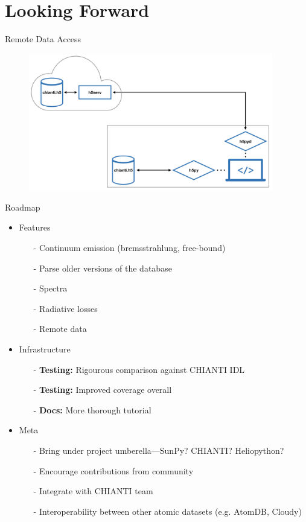 \documentclass[12pt,aspectratio=169]{beamer}
\begin{document}
\section{Looking Forward}
\begin{frame}{Remote Data Access}
    \begin{figure}
        \centering
        \includegraphics[width=0.95\textwidth]{../figures/cloud_diagram.png}
    \end{figure}
\end{frame}
\begin{frame}[allowframebreaks]{Roadmap}
    \begin{itemize}
        \item Features
        \begin{itemize}
            \item[-] Continuum emission (bremsstrahlung, free-bound)
            \item[-] Parse older versions of the database
            \item[-] Spectra
            \item[-] Radiative losses 
            \item[-] Remote data
        \end{itemize}
        \item Infrastructure
        \begin{itemize}
            \item[-] \textbf{Testing:} Rigourous comparison against CHIANTI IDL
            \item[-] \textbf{Testing:} Improved coverage overall
            \item[-] \textbf{Docs:} More thorough tutorial
        \end{itemize}
        \item Meta
        \begin{itemize}
            \item[-] Bring under project umberella---SunPy? CHIANTI? Heliopython?
            \item[-] Encourage contributions from community 
            \item[-] Integrate with CHIANTI team 
            \item[-] Interoperability between other atomic datasets (e.g. AtomDB, Cloudy) 
        \end{itemize}
    \end{itemize}
\end{frame}
\end{document}
